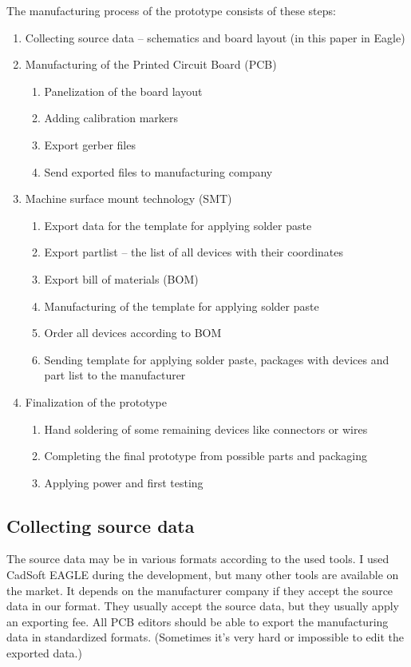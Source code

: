 The manufacturing process of the prototype consists of these steps:
\begin{enumerate}
	\item Collecting source data -- schematics and board layout (in this paper in Eagle)
	\item Manufacturing of the Printed Circuit Board (\ac{PCB})
	\begin{enumerate}
		\item Panelization of the board layout
		\item Adding calibration markers
		\item Export gerber files
		\item Send exported files to manufacturing company
	\end{enumerate}
	\item Machine surface mount technology (\ac{SMT})
	\begin{enumerate}
		\item Export data for the template for applying solder paste
		\item Export partlist -- the list of all devices with their coordinates
		\item Export bill of materials (\ac{BOM})
		\item Manufacturing of the template for applying solder paste
		\item Order all devices according to \ac{BOM}
		\item Sending template for applying solder paste, packages with devices and part list to the manufacturer
	\end{enumerate}
	\item Finalization of the prototype
	\begin{enumerate}
		\item Hand soldering of some remaining devices like connectors or wires
		\item Completing the final prototype from possible parts and packaging
		\item Applying power and first testing
	\end{enumerate}
\end{enumerate}

\subsection{Collecting source data}
The source data may be in various formats according to the used tools. I used CadSoft \ac{EAGLE} \cite{EAGLE} during the development, but many other tools are available on the market. It depends on the manufacturer company if they accept the source data in our format. They usually accept the source data, but they usually apply an exporting fee. All \ac{PCB} editors should be able to export the manufacturing data in standardized formats. (Sometimes it's very hard or impossible to edit the exported data.)

